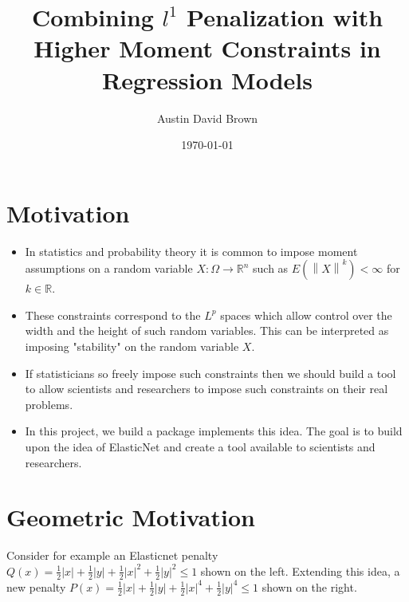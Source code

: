\documentclass[10pt, reqno]{article}
\numberwithin{equation}{section}
\newcommand{\norm}[1]{\left\lVert#1\right\rVert}
\newcommand{\R}{\mathbb{R}}
\begin{document}
\setlength{\footskip}{-1cm}
 

\title{Combining $l^1$ Penalization with Higher Moment Constraints in Regression Models}
\author{Austin David Brown}
\date{\today}

\maketitle

\newpage
\section*{Motivation}

\begin{itemize}
\item In statistics and probability theory it is common to impose moment assumptions on a random variable $X : \Omega \to \R^n$ such as $E(\norm{X}^k) < \infty$ for $k \in \R$.

\item These constraints correspond to the $L^p$ spaces which allow control over the width and the height of such random variables.
This can be interpreted as imposing "stability" on the random variable $X$.

\item If statisticians so freely impose such constraints then we should build a tool to allow scientists and researchers to impose such constraints on their real problems.

\item  In this project, we build a package implements this idea.
The goal is to build upon the idea of ElasticNet \cite{elasticnet} and create a tool available to scientists and researchers.

\end{itemize}

\newpage
\section*{Geometric Motivation}
Consider for example an Elasticnet \cite{elasticnet} penalty $Q(x) = \frac{1}{2} |x| + \frac{1}{2} |y| + \frac{1}{2} |x|^2 + \frac{1}{2} |y|^2 \le 1$
shown on the left. Extending this idea, a new penalty $P(x) = \frac{1}{2} |x| + \frac{1}{2} |y| + \frac{1}{2} |x|^4 + \frac{1}{2} |y|^4 \le 1$ shown on the right.
\end{document}
